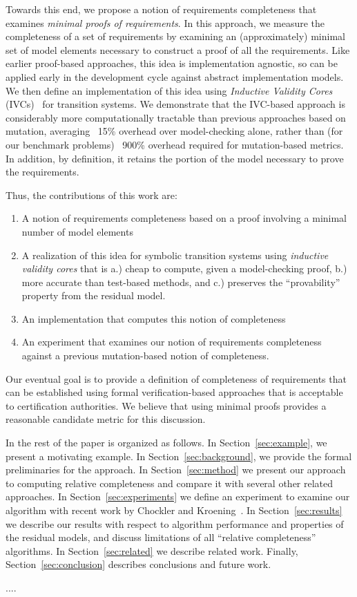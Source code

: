 \noindent Towards this end, we propose a notion of requirements completeness that examines {\em minimal proofs of requirements}.  In this approach, we measure the completeness of a set of requirements by examining an (approximately) minimal set of model elements necessary to construct a proof of all the requirements.  Like earlier proof-based approaches, this idea is implementation agnostic, so can be applied early in the development cycle against abstract implementation models.  We then define an implementation of this idea using {\em Inductive Validity Cores} (IVCs)~\cite{}  for transition systems.  We demonstrate that the IVC-based approach is considerably more computationally tractable than previous approaches based on mutation, averaging ~15\% overhead over model-checking alone, rather than (for our benchmark problems) ~900\% overhead required for mutation-based metrics.  In addition, by definition, it retains the portion of the model necessary to prove the requirements.

Thus, the contributions of this work are:
\begin{enumerate}
\item A notion of requirements completeness based on a proof involving a minimal number of model elements
\item A realization of this idea for symbolic transition systems using {\em inductive validity cores} that is a.) cheap to compute, given a model-checking proof, b.) more accurate than test-based methods, and c.) preserves the ``provability'' property from the residual model.
\item An implementation that computes this notion of completeness
\item An experiment that examines our notion of requirements completeness against a previous mutation-based notion of completeness.
\end{enumerate}

\noindent Our eventual goal is to provide a definition of completeness of requirements that can be established using formal verification-based approaches that is acceptable to certification authorities.  We believe that using minimal proofs provides a reasonable candidate metric for this discussion.


In the rest of the paper is organized as follows.  In Section~\ref{sec:example}, we present a motivating example.  In Section~\ref{sec:background}, we provide the formal preliminaries for the approach.  In Section~\ref{sec:method} we present our approach to computing relative completeness and compare it with several other related approaches.  In Section~\ref{sec:experiments} we define an experiment to examine our algorithm with recent work by Chockler and Kroening~\cite{chockler2010coverage}.  In Section~\ref{sec:results} we describe our results with respect to algorithm performance and properties of the residual models, and discuss limitations of all ``relative completeness'' algorithms.  In Section~\ref{sec:related} we describe related work.  Finally, Section~\ref{sec:conclusion} describes conclusions and future work.


....

